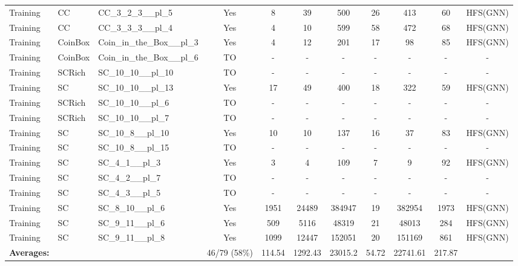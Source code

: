 \documentclass{article}
\begin{document}
\begin{tabular}{lllcccccccc}
Training & CC & CC\_3\_2\_3\_\_pl\_5 & Yes & 8 & 39 & 500 & 26 & 413 & 60 & HFS(GNN) \\
Training & CC & CC\_3\_3\_3\_\_pl\_4 & Yes & 4 & 10 & 599 & 58 & 472 & 68 & HFS(GNN) \\
Training & CoinBox & Coin\_in\_the\_Box\_\_pl\_3 & Yes & 4 & 12 & 201 & 17 & 98 & 85 & HFS(GNN) \\
Training & CoinBox & Coin\_in\_the\_Box\_\_pl\_6 & TO & - & - & - & - & - & - & - \\
Training & SCRich & SC\_10\_10\_\_pl\_10 & TO & - & - & - & - & - & - & - \\
Training & SC & SC\_10\_10\_\_pl\_13 & Yes & 17 & 49 & 400 & 18 & 322 & 59 & HFS(GNN) \\
Training & SCRich & SC\_10\_10\_\_pl\_6 & TO & - & - & - & - & - & - & - \\
Training & SCRich & SC\_10\_10\_\_pl\_7 & TO & - & - & - & - & - & - & - \\
Training & SC & SC\_10\_8\_\_pl\_10 & Yes & 10 & 10 & 137 & 16 & 37 & 83 & HFS(GNN) \\
Training & SC & SC\_10\_8\_\_pl\_15 & TO & - & - & - & - & - & - & - \\
Training & SC & SC\_4\_1\_\_pl\_3 & Yes & 3 & 4 & 109 & 7 & 9 & 92 & HFS(GNN) \\
Training & SC & SC\_4\_2\_\_pl\_7 & TO & - & - & - & - & - & - & - \\
Training & SC & SC\_4\_3\_\_pl\_5 & TO & - & - & - & - & - & - & - \\
Training & SC & SC\_8\_10\_\_pl\_6 & Yes & 1951 & 24489 & 384947 & 19 & 382954 & 1973 & HFS(GNN) \\
Training & SC & SC\_9\_11\_\_pl\_6 & Yes & 509 & 5116 & 48319 & 21 & 48013 & 284 & HFS(GNN) \\
Training & SC & SC\_9\_11\_\_pl\_8 & Yes & 1099 & 12447 & 152051 & 20 & 151169 & 861 & HFS(GNN) \\
\textbf{Averages:} & & & 46/79 (58\%) & 114.54 & 1292.43 & 23015.2 & 54.72 & 22741.61 & 217.87 & \\
\bottomrule
\end{tabular}
\newpage
\end{document}

